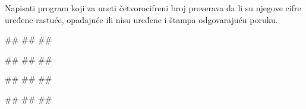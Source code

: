 \begin{Exercise}[label=v1.2_13] 
Napisati program koji za uneti četvorocifreni broj proverava
da li su njegove cifre uređene rastuće, opadajuće ili nisu
uređene i štampa odgovarajuću poruku.

\begin{miditest}
\begin{upotreba}{1}
#\naslovInt#
##
##
\end{upotreba}
\end{miditest}
\begin{miditest}
\begin{upotreba}{2}
#\naslovInt#
##
##\end{upotreba}
\end{miditest}

\begin{miditest}
\begin{upotreba}{3}
#\naslovInt#
##
##\end{upotreba}
\end{miditest}
\begin{miditest}
\begin{upotreba}{4}
#\naslovInt#
##
##\end{upotreba}
\end{miditest}

\end{Exercise}
\begin{Answer}[ref=v1.2_13]
\end{Answer}


